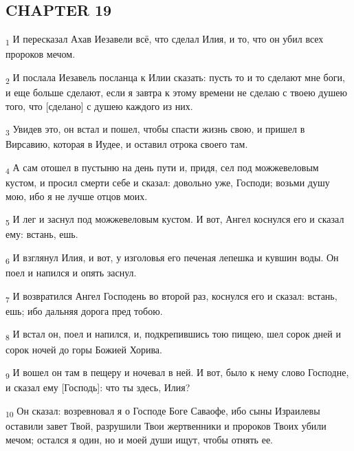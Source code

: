 \subsection{CHAPTER 19}
\begin{tcolorbox}
\textsubscript{1} И пересказал Ахав Иезавели всё, что сделал Илия, и то, что он убил всех пророков мечом.
\end{tcolorbox}
\begin{tcolorbox}
\textsubscript{2} И послала Иезавель посланца к Илии сказать: пусть то и то сделают мне боги, и еще больше сделают, если я завтра к этому времени не сделаю с твоею душею того, что [сделано] с душею каждого из них.
\end{tcolorbox}
\begin{tcolorbox}
\textsubscript{3} Увидев это, он встал и пошел, чтобы спасти жизнь свою, и пришел в Вирсавию, которая в Иудее, и оставил отрока своего там.
\end{tcolorbox}
\begin{tcolorbox}
\textsubscript{4} А сам отошел в пустыню на день пути и, придя, сел под можжевеловым кустом, и просил смерти себе и сказал: довольно уже, Господи; возьми душу мою, ибо я не лучше отцов моих.
\end{tcolorbox}
\begin{tcolorbox}
\textsubscript{5} И лег и заснул под можжевеловым кустом. И вот, Ангел коснулся его и сказал ему: встань, ешь.
\end{tcolorbox}
\begin{tcolorbox}
\textsubscript{6} И взглянул Илия, и вот, у изголовья его печеная лепешка и кувшин воды. Он поел и напился и опять заснул.
\end{tcolorbox}
\begin{tcolorbox}
\textsubscript{7} И возвратился Ангел Господень во второй раз, коснулся его и сказал: встань, ешь; ибо дальняя дорога пред тобою.
\end{tcolorbox}
\begin{tcolorbox}
\textsubscript{8} И встал он, поел и напился, и, подкрепившись тою пищею, шел сорок дней и сорок ночей до горы Божией Хорива.
\end{tcolorbox}
\begin{tcolorbox}
\textsubscript{9} И вошел он там в пещеру и ночевал в ней. И вот, было к нему слово Господне, и сказал ему [Господь]: что ты здесь, Илия?
\end{tcolorbox}
\begin{tcolorbox}
\textsubscript{10} Он сказал: возревновал я о Господе Боге Саваофе, ибо сыны Израилевы оставили завет Твой, разрушили Твои жертвенники и пророков Твоих убили мечом; остался я один, но и моей души ищут, чтобы отнять ее.
\end{tcolorbox}
